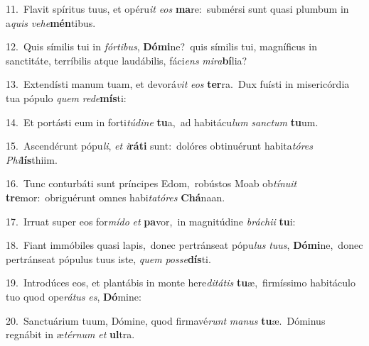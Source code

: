 {\numbfont\textcolor{\numbcolor}{11.}}~Flavit spíritus tuus, et opéru\textit{it} \textit{e}\-\textit{os} \textbf{ma}\-re:~\star submérsi sunt quasi plumbum in a\textit{quis} \textit{ve}\-\textit{he}\textbf{mén}tibus.\par
{\numbfont\textcolor{\numbcolor}{12.}}~Quis símilis tui in \textit{fór}\-\textit{ti}\textit{bus}, \textbf{Dó}\-\textbf{mi}ne?~\star quis símilis tui, magníficus in sanctitáte, terríbilis atque laudábilis, fáci\textit{ens} \textit{mi}\-\textit{ra}\textbf{bí}lia?\par
{\numbfont\textcolor{\numbcolor}{13.}}~Extendísti manum tuam, et devorá\textit{vit} \textit{e}\-\textit{os} \textbf{ter}\-ra.~\star Dux fuísti in misericórdia tua pópulo \textit{quem} \textit{red}\-\textit{e}\textbf{mís}ti:\par
{\numbfont\textcolor{\numbcolor}{14.}}~Et portásti eum in forti\-\textit{tú}\-\textit{di}\textit{ne} \textbf{tu}\-a,~\star ad habitácu\textit{lum} \textit{sanc}\-\textit{tum} \textbf{tu}\-um.\par
{\numbfont\textcolor{\numbcolor}{15.}}~Ascendérunt pópu\-\textit{li}\-, \textit{et} \textit{i}\-\textbf{rá}\textbf{ti} sunt:~\star dolóres obtinuérunt habita\-\textit{tó}\-\textit{res} \textit{Phi}\-\textbf{lís}thiim.\par
{\numbfont\textcolor{\numbcolor}{16.}}~Tunc conturbáti sunt príncipes Edom,~\dagger robústos Moab ob\-\textit{tí}\-\textit{nu}\textit{it} \textbf{tre}\-mor:~\star obriguérunt omnes habi\-\textit{ta}\-\textit{tó}\textit{res} \textbf{Chá}\-naan.\par
{\numbfont\textcolor{\numbcolor}{17.}}~Irruat super eos for\-\textit{mí}\-\textit{do} \textit{et} \textbf{pa}\-vor,~\star in magnitúdine \textit{brá}\-\textit{chi}\textit{i} \textbf{tu}\-i:\par
{\numbfont\textcolor{\numbcolor}{18.}}~Fiant immóbiles quasi lapis,~\dagger donec pertránseat pópu\textit{lus} \textit{tu}\-\textit{us}, \textbf{Dó}\-\textbf{mi}ne,~\star donec pertránseat pópulus tuus iste, \textit{quem} \textit{pos}\-\textit{se}\textbf{dís}ti.\par
{\numbfont\textcolor{\numbcolor}{19.}}~Introdúces eos, et plantábis in monte here\-\textit{di}\-\textit{tá}\textit{tis} \textbf{tu}\-æ,~\star firmíssimo habitáculo tuo quod ope\-\textit{rá}\-\textit{tus} \textit{es}\-, \textbf{Dó}\-mine:\par
{\numbfont\textcolor{\numbcolor}{20.}}~Sanctuárium tuum, Dómine, quod firmavé\textit{runt} \textit{ma}\-\textit{nus} \textbf{tu}\-æ.~\star Dóminus regnábit in æ\-\textit{tér}\-\textit{num} \textit{et} \textbf{ul}\-tra.\par
